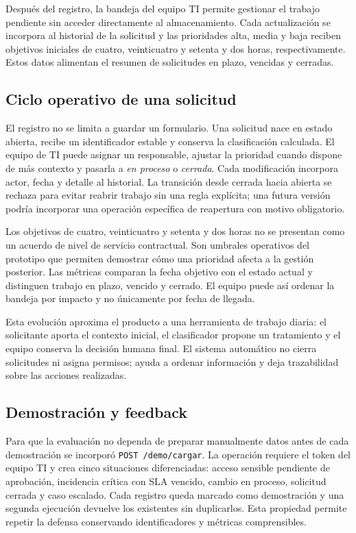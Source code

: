 Después del registro, la bandeja del equipo TI permite gestionar el trabajo pendiente sin acceder directamente al almacenamiento. Cada actualización se incorpora al historial de la solicitud y las prioridades alta, media y baja reciben objetivos iniciales de cuatro, veinticuatro y setenta y dos horas, respectivamente. Estos datos alimentan el resumen de solicitudes en plazo, vencidas y cerradas.

\subsection{Ciclo operativo de una solicitud}

El registro no se limita a guardar un formulario. Una solicitud nace en estado abierta, recibe un identificador estable y conserva la clasificación calculada. El equipo de TI puede asignar un responsable, ajustar la prioridad cuando dispone de más contexto y pasarla a \textit{en proceso} o \textit{cerrada}. Cada modificación incorpora actor, fecha y detalle al historial. La transición desde cerrada hacia abierta se rechaza para evitar reabrir trabajo sin una regla explícita; una futura versión podría incorporar una operación específica de reapertura con motivo obligatorio.

Los objetivos de cuatro, veinticuatro y setenta y dos horas no se presentan como un acuerdo de nivel de servicio contractual. Son umbrales operativos del prototipo que permiten demostrar cómo una prioridad afecta a la gestión posterior. Las métricas comparan la fecha objetivo con el estado actual y distinguen trabajo en plazo, vencido y cerrado. El equipo puede así ordenar la bandeja por impacto y no únicamente por fecha de llegada.

Esta evolución aproxima el producto a una herramienta de trabajo diaria: el solicitante aporta el contexto inicial, el clasificador propone un tratamiento y el equipo conserva la decisión humana final. El sistema automático no cierra solicitudes ni asigna permisos; ayuda a ordenar información y deja trazabilidad sobre las acciones realizadas.

\subsection{Demostración y feedback}

Para que la evaluación no dependa de preparar manualmente datos antes de cada demostración se incorporó \texttt{POST /demo/cargar}. La operación requiere el token del equipo TI y crea cinco situaciones diferenciadas: acceso sensible pendiente de aprobación, incidencia crítica con SLA vencido, cambio en proceso, solicitud cerrada y caso escalado. Cada registro queda marcado como demostración y una segunda ejecución devuelve los existentes sin duplicarlos. Esta propiedad permite repetir la defensa conservando identificadores y métricas comprensibles.

